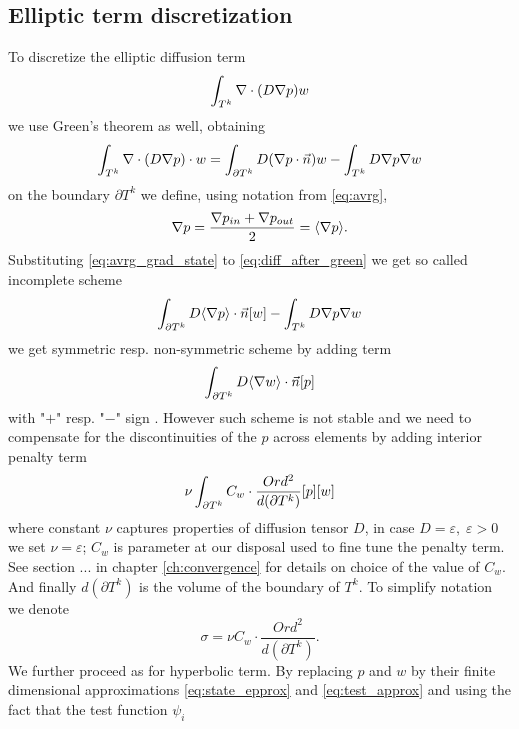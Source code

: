 \subsection{Elliptic term discretization}
\label{se:diff_term}
To discretize the elliptic diffusion term
$$
\int_{T^k}\nabla\cdot(D\nabla p) w
$$
we use Green's theorem as well, obtaining
\begin{equation}
	\label{eq:diff_after_green}
	\int_{T^k}\nabla \cdot (D \nabla p)\cdot w  = \int_{\partial T^k} D(\nabla p\cdot\vec{n}) w - \int_{T^k} D\nabla p \nabla w
\end{equation}
on the boundary $\partial T^k$ we define, using notation from \eqref{eq:avrg},
\begin{equation}
	\nabla p = \frac{\nabla p_{in} + \nabla p_{out}}{2} = \langle\nabla p\rangle.
	\label{eq:avrg_grad_state}
\end{equation}
Substituting \eqref{eq:avrg_grad_state} to \eqref{eq:diff_after_green} we get 
so called incomplete scheme
\begin{equation}
		\int_{\partial T^k} D \langle\nabla p\rangle \cdot \vec{n} [w] - \int_{T^k} D\nabla p \nabla w
\end{equation}
we get symmetric resp. non-symmetric scheme by adding term
\begin{equation}
	\int_{\partial T^k} D \langle\nabla w \rangle\cdot \vec{n} [p]
\end{equation}
with "$+$" resp. "$-$" sign \cite{Kucera}. However such scheme is not stable and we need 
to compensate for
the discontinuities of the $p$ across elements by adding interior penalty term \cite{Kucera, Antonietti2013}
\begin{equation}
	\nu \int_{\partial T^k} C_w \cdot \frac{Ord^2}{d(\partial T^k)} [p][w]
\end{equation}
where constant $\nu$ captures properties of diffusion tensor $D$, in case $D = 
\varepsilon, \; \varepsilon > 0$ we set $\nu = \varepsilon$; $C_w$ is parameter 
at our disposal used to fine tune the penalty term.
See section ... in chapter 
\ref{ch:convergence} for details on choice of the value of $C_w$. And finally 
$d(\partial T^k)$ is the volume of the boundary of $T^k$. To simplify notation 
we denote
\begin{equation}\label{eq:diff_penalty_sigma}
\sigma = \nu C_w \cdot \frac{Ord^2}{d(\partial T^k)}.
\end{equation} 
We further proceed as for hyperbolic term. By replacing $p$ and $w$ by their 
finite dimensional approximations \eqref{eq:state_epprox} and 
\eqref{eq:test_approx} and using the fact that the test function $\psi_i$ 
